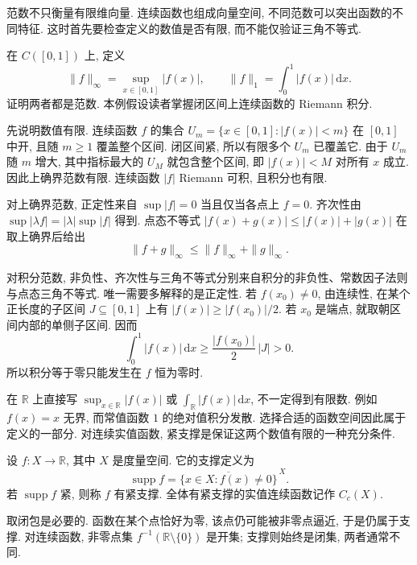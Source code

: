 \label{ch:eucompact:support}

范数不只衡量有限维向量. 连续函数也组成向量空间, 不同范数可以突出函数的不同特征. 这时首先要检查定义的数值是否有限, 而不能仅验证三角不等式.

\begin{example}
在 $C([0,1])$ 上, 定义
\[
 \|f\|_\infty=\sup_{x\in[0,1]}|f(x)|,
 \qquad \|f\|_1=\int_0^1|f(x)|\,\mathrm{d}x.
\]
证明两者都是范数. 本例假设读者掌握闭区间上连续函数的 Riemann 积分.
\end{example}
\begin{solution}
先说明数值有限. 连续函数 $f$ 的集合
$U_m=\{x\in[0,1]:|f(x)|<m\}$ 在 $[0,1]$ 中开, 且随 $m\geq1$ 覆盖整个区间. 闭区间紧, 所以有限多个 $U_m$ 已覆盖它. 由于 $U_m$ 随 $m$ 增大, 其中指标最大的 $U_M$ 就包含整个区间, 即 $|f(x)|<M$ 对所有 $x$ 成立. 因此上确界范数有限. 连续函数 $|f|$ Riemann 可积, 且积分也有限.

对上确界范数, 正定性来自 $\sup|f|=0$ 当且仅当各点上 $f=0$. 齐次性由 $\sup|\lambda f|=|\lambda|\sup|f|$ 得到. 点态不等式 $|f(x)+g(x)|\leq|f(x)|+|g(x)|$ 在取上确界后给出
\[
 \|f+g\|_\infty\leq\|f\|_\infty+\|g\|_\infty.
\]

对积分范数, 非负性、齐次性与三角不等式分别来自积分的非负性、常数因子法则与点态三角不等式. 唯一需要多解释的是正定性. 若 $f(x_0)\ne0$, 由连续性, 在某个正长度的子区间 $J\subseteq[0,1]$ 上有 $|f(x)|\geq|f(x_0)|/2$. 若 $x_0$ 是端点, 就取朝区间内部的单侧子区间. 因而
\[
 \int_0^1|f(x)|\,\mathrm{d}x
 \geq\frac{|f(x_0)|}{2}\,|J|>0.
\]
所以积分等于零只能发生在 $f$ 恒为零时.
\end{solution}

在 $\mathbb{R}$ 上直接写 $\sup_{x\in\mathbb{R}}|f(x)|$ 或 $\int_{\mathbb{R}}|f(x)|\,\mathrm{d}x$, 不一定得到有限数. 例如 $f(x)=x$ 无界, 而常值函数 $1$ 的绝对值积分发散. 选择合适的函数空间因此属于定义的一部分. 对连续实值函数, 紧支撑是保证这两个数值有限的一种充分条件.

\begin{definition}[支撑与紧支撑]
设 $f:X\to\mathbb{R}$, 其中 $X$ 是度量空间. 它的支撑定义为
\[
 \operatorname{supp}f=
 \overline{\{x\in X:f(x)\ne0\}}^{\,X}.
\]
若 $\operatorname{supp}f$ 紧, 则称 $f$ 有紧支撑. 全体有紧支撑的实值连续函数记作 $C_c(X)$.
\end{definition}

取闭包是必要的. 函数在某个点恰好为零, 该点仍可能被非零点逼近, 于是仍属于支撑. 对连续函数, 非零点集 $f^{-1}(\mathbb{R}\setminus\{0\})$ 是开集; 支撑则始终是闭集, 两者通常不同.

